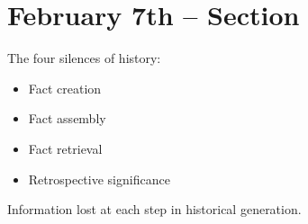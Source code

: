 \section{February 7th -- Section}

The four silences of history:

\begin{itemize}
  \item Fact creation
  \item Fact assembly
  \item Fact retrieval  
  \item Retrospective significance
\end{itemize}

Information lost at each step in historical generation.